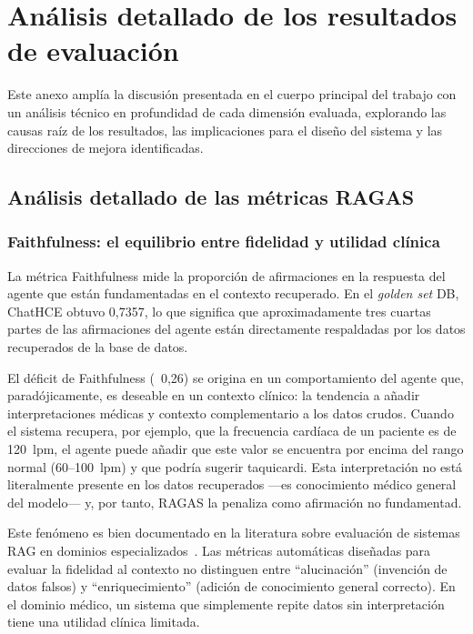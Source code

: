 
\chapter{Análisis detallado de los resultados de evaluación}
\label{sec:anexo_evaluacion}

Este anexo amplía la discusión presentada en el cuerpo principal del trabajo con un análisis técnico en profundidad de cada dimensión evaluada, explorando las causas raíz de los resultados, las implicaciones para el diseño del sistema y las direcciones de mejora identificadas.


\section{Análisis detallado de las métricas RAGAS}


\subsection{Faithfulness: el equilibrio entre fidelidad y utilidad clínica}

La métrica Faithfulness mide la proporción de afirmaciones en la respuesta del agente que están fundamentadas en el contexto recuperado. En el \textit{golden set} DB, ChatHCE obtuvo 0,7357, lo que significa que aproximadamente tres cuartas partes de las afirmaciones del agente están directamente respaldadas por los datos recuperados de la base de datos.

El déficit de Faithfulness (~0,26) se origina en un comportamiento del agente que, paradójicamente, es deseable en un contexto clínico: la tendencia a añadir interpretaciones médicas y contexto complementario a los datos crudos. Cuando el sistema recupera, por ejemplo, que la frecuencia cardíaca de un paciente es de 120~lpm, el agente puede añadir que este valor se encuentra por encima del rango normal (60--100~lpm) y que podría sugerir taquicardi. Esta interpretación no está literalmente presente en los datos recuperados ---es conocimiento médico general del modelo--- y, por tanto, \ac{RAGAS} la penaliza como afirmación no fundamentad.

Este fenómeno es bien documentado en la literatura sobre evaluación de sistemas \ac{RAG} en dominios especializados~\parencite{Gan2025rageval}. Las métricas automáticas diseñadas para evaluar la fidelidad al contexto no distinguen entre ``alucinación'' (invención de datos falsos) y ``enriquecimiento'' (adición de conocimiento general correcto). En el dominio médico, un sistema que simplemente repite datos sin interpretación tiene una utilidad clínica limitada.

